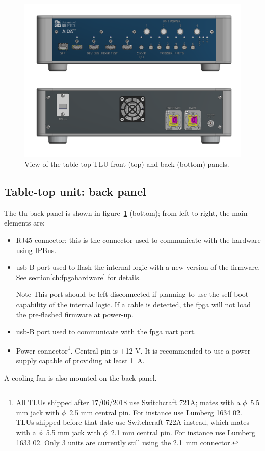 \begin{figure}
  \centering
  \includegraphics[width=.990\textwidth]{./Images/TLU_front_back.pdf}
  \caption{View of the table-top TLU front (top) and back (bottom) panels.}
  \label{fig:tabletop}
\end{figure}

\subsection{Table-top unit: back panel}\label{ch:backpanelintro}
The \gls{tlu} back panel is shown in figure~\ref{fig:tabletop} (bottom); from left to right, the main elements are:
\begin{itemize}
  \item RJ45 connector: this is the connector used to communicate with the hardware using IPBus.
  \item \gls{usb}-B port used to flash the internal logic with a new version of the firmware. See section\ref{ch:fpgahardware} for details.
  \begin{alertinfo}{Note}
    This port should be left disconnected if planning to use the self-boot capability of the internal logic. If a cable is detected, the \gls{fpga} will not load the pre-flashed firmware at power-up.
  \end{alertinfo}
  \item \gls{usb}-B port used to communicate with the \gls{fpga} \gls{uart} port.
  \item Power connector\footnote{All TLUs shipped after 17/06/2018 use Switchcraft 721A; mates with a $\phi$~5.5 mm jack with $\phi$~2.5 mm central pin. For instance use Lumberg 1634 02.\\ TLUs shipped before that date use Switchcraft 722A instead, which mates with a $\phi$~5.5 mm jack with $\phi$~2.1 mm central pin. For instance use Lumberg 1633 02. Only 3 units are currently still using the 2.1~mm connector.}. Central pin is +12 V. It is recommended to use a power supply capable of providing at least 1~A.
\end{itemize}
A cooling fan is also mounted on the back panel.

